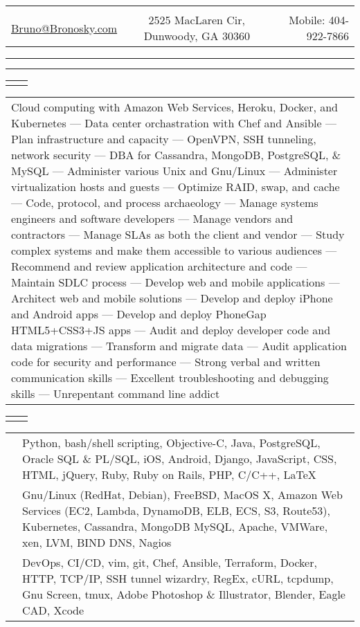 \documentclass[letterpaper,10pt]{article}
\newcommand{\lineDouble}[0]{\hrule\vspace{2pt}\hrule\vspace{1.5pt}}
\newcommand{\sizeE}[0]{\fontsize{10pt}{12pt}\selectfont}
\newcommand{\sizeF}[0]{\fontsize{11pt}{13pt}\selectfont}
\newcommand{\heading}[4]{
    \begin{tabularx}{\textwidth}{LCR}
        &\huge{\textbf{\sc{#1}}}&\\
        \href{mailto:#2}{#2} & #3 & Mobile: #4\\
    \end{tabularx}
    \lineDouble
    \vspace{5pt}%
}
\newcounter{skipfirstcounter}
\newcommand{\blocktitle}[1]{
	\setcounter{skipfirstcounter}{0}
    \begin{tabularx}{\textwidth}{lR}
        {\sizeF\sc{#1}} & \noindent\hrulefill\\
    \end{tabularx}
}
\newcommand{\blockOverview}[1]{%
    \blocktitle{Overview}%
    \vspace{0.4mm}%
    \begin{tabular*}{\textwidth}{p{\textwidth}}%
        #1%
    \end{tabular*}%
	\vspace{2mm}%
}%
\newcommand{\blockSkills}[1]{
    \blocktitle{Skills}
    \begin{tabular*}{\textwidth}{p{22mm}p{171.6mm}}%
        #1%
    \end{tabular*}%
	\vspace{2.4mm}%
}
\newcommand{\skillgroup}[2]{{\sizeE{#1}} & #2\\\addlinespace[1.6mm]}
\newcommand{\skillgrouplast}[2]{{\sizeE{#1}} & #2\\}
\begin{document}
\heading{Bruno Bronosky}
{Bruno@Bronosky.com}
{2525 MacLaren Cir, Dunwoody, GA 30360}
{404-922-7866}

\blockOverview{
    Cloud computing with Amazon Web Services, Heroku, Docker, and Kubernetes ---
    Data center orchastration with Chef and Ansible ---
    Plan infrastructure and capacity ---
    OpenVPN, SSH tunneling, network security ---
    DBA for Cassandra, MongoDB, PostgreSQL, \& MySQL ---
    Administer various Unix and Gnu/Linux ---
    Administer virtualization hosts and guests ---
    Optimize RAID, swap, and cache ---
    Code, protocol, and process archaeology ---
    Manage systems engineers and software developers ---
    Manage vendors and contractors ---
    Manage SLAs as both the client and vendor ---
    Study complex systems and make them accessible to various audiences ---
    Recommend and review application architecture and code ---
    Maintain SDLC process ---
    Develop web and mobile applications ---
    Architect web and mobile solutions ---
    Develop and deploy iPhone and Android apps ---
    Develop and deploy PhoneGap HTML5+CSS3+JS apps ---
    Audit and deploy developer code and data migrations ---
    Transform and migrate data ---
    Audit application code for security and performance ---
    Strong verbal and written communication skills ---
    Excellent troubleshooting and debugging skills ---
    Unrepentant command line addict
}

\blockSkills{
    \skillgroup{Development}{
        Python,
        bash/shell scripting,
        Objective-C,
        Java,
        PostgreSQL,
        Oracle SQL \& PL/SQL,
        iOS,
        Android,
        Django,
        JavaScript,
        CSS,
        HTML,
        jQuery,
        Ruby,
        Ruby on Rails,
        PHP,
        C/C++,
        \LaTeX
    }

    \skillgroup{Operations}{
        Gnu/Linux (RedHat, Debian),
        FreeBSD,
        MacOS X,
        Amazon Web Services (EC2, Lambda, DynamoDB, ELB, ECS, S3, Route53),
        Kubernetes,
        Cassandra,
        MongoDB
        MySQL,
        Apache,
        VMWare,
        xen,
        LVM,
        BIND DNS,
        Nagios
    }

    \skillgrouplast{Concepts}{
        DevOps,
        CI/CD,
        vim,
        git,
        Chef,
        Ansible,
        Terraform,
        Docker,
        HTTP,
        TCP/IP,
        SSH tunnel wizardry,
        RegEx,
        cURL,
        tcpdump,
        Gnu Screen,
        tmux,
        Adobe Photoshop \& Illustrator,
        Blender,
        Eagle CAD,
        Xcode
    }
}
\end{document}

